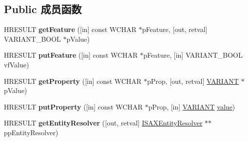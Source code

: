 \subsection*{Public 成员函数}
\begin{DoxyCompactItemize}
\item 
\mbox{\label{interface_m_s_x_m_l2_1_1_i_s_a_x_x_m_l_reader_a2869eb968a5789cd386f77d041f06b1c}} 
H\+R\+E\+S\+U\+LT {\bfseries get\+Feature} (\mbox{[}in\mbox{]} const W\+C\+H\+AR $\ast$p\+Feature, \mbox{[}out, retval\mbox{]} V\+A\+R\+I\+A\+N\+T\+\_\+\+B\+O\+OL $\ast$p\+Value)
\item 
\mbox{\label{interface_m_s_x_m_l2_1_1_i_s_a_x_x_m_l_reader_a966dda0d9b7c8bb70dce9fa2c6b64f3a}} 
H\+R\+E\+S\+U\+LT {\bfseries put\+Feature} (\mbox{[}in\mbox{]} const W\+C\+H\+AR $\ast$p\+Feature, \mbox{[}in\mbox{]} V\+A\+R\+I\+A\+N\+T\+\_\+\+B\+O\+OL vf\+Value)
\item 
\mbox{\label{interface_m_s_x_m_l2_1_1_i_s_a_x_x_m_l_reader_af8389e674e3029871dc1079109a76883}} 
H\+R\+E\+S\+U\+LT {\bfseries get\+Property} (\mbox{[}in\mbox{]} const W\+C\+H\+AR $\ast$p\+Prop, \mbox{[}out, retval\mbox{]} \hyperlink{structtag_v_a_r_i_a_n_t}{V\+A\+R\+I\+A\+NT} $\ast$p\+Value)
\item 
\mbox{\label{interface_m_s_x_m_l2_1_1_i_s_a_x_x_m_l_reader_afe52281bffd60ebf417d762776f59e6b}} 
H\+R\+E\+S\+U\+LT {\bfseries put\+Property} (\mbox{[}in\mbox{]} const W\+C\+H\+AR $\ast$p\+Prop, \mbox{[}in\mbox{]} \hyperlink{structtag_v_a_r_i_a_n_t}{V\+A\+R\+I\+A\+NT} \hyperlink{unionvalue}{value})
\item 
\mbox{\label{interface_m_s_x_m_l2_1_1_i_s_a_x_x_m_l_reader_a32edf4b3dccbef367949bd5b593c30e6}} 
H\+R\+E\+S\+U\+LT {\bfseries get\+Entity\+Resolver} (\mbox{[}out, retval\mbox{]} \hyperlink{interface_m_s_x_m_l2_1_1_i_s_a_x_entity_resolver}{I\+S\+A\+X\+Entity\+Resolver} $\ast$$\ast$pp\+Entity\+Resolver)
\item 
\mbox{\label{interface_m_s_x_m_l2_1_1_i_s_a_x_x_m_l_reader_acb43fff6e9ce8e001c6fa7af71a2b5f8}} 
$$
\end{DoxyCompactItemize}
